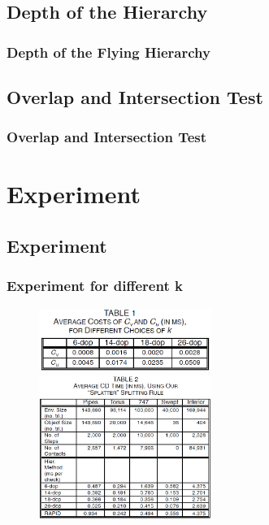\documentclass{beamer}
\begin{document}
\subsection{Depth of the Hierarchy}
	\begin{frame}
	\frametitle{Depth of the Flying Hierarchy}
	\end{frame}

\subsection{Overlap and Intersection Test}
	\begin{frame}
	\frametitle{Overlap and Intersection Test}
	\end{frame}

\section{Experiment}

\subsection{Experiment}
	\begin{frame}
	\frametitle{Experiment for different k}
	\begin{figure}[h!]
		\centering
		\includegraphics[width=0.5\textwidth]{./figure/TABLE1.PNG}
		\includegraphics[width=0.5\textwidth]{./figure/TABLE2.PNG}
	\end{figure}
	\end{frame}
\end{document}
